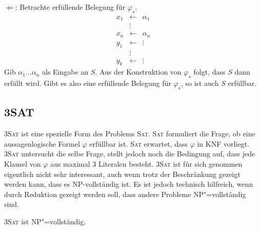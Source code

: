\begin{Bew}
  \glq$\Leftarrow$\grq: Betrachte erfüllende Belegung für $\varphi_s$.
  \[ \begin{array}{rcl} x_1 & \leftarrow & \alpha_1 \\ & \vdots & \\x_n & \leftarrow & \alpha_n \\ y_1 & \leftarrow & \vdots\\ & \vdots & \\ y_k & \leftarrow & \vdots \end{array}\]
  Gib $\alpha_1 \ldots \alpha_n$ als Eingabe an $S$. Aus der Konstruktion von $\varphi_s$ folgt, dass $S$ dann erfüllt wird. Gibt es also eine erfüllende Belegung für $\varphi_s$, so ist auch $S$ erfüllbar.
\end{Bew}

\subsection{3SAT}
\textsc{3Sat} ist eine spezielle Form des Problems \textsc{Sat}. \textsc{Sat} formuliert die Frage, ob eine aussagenlogische Formel $\varphi$ erfüllbar ist. \textsc{Sat} erwartet, dass $\varphi$ in KNF vorliegt. \textsc{3Sat} untersucht die selbe Frage, stellt jedoch noch die Bedingung auf, dass jede Klausel von $\varphi$ aus maximal 3 Literalen besteht. \textsc{3Sat} ist für sich genommen eigentlich nicht sehr interessant, auch wenn trotz der Beschränkung gezeigt werden kann, dass es \textsf{NP}-vollständig ist. Es ist jedoch technisch hilfreich, wenn durch Reduktion gezeigt werden soll, dass andere Probleme \textsf{NP}"=vollständig sind.

\begin{Beh}
  \hspace{\parindent}\textsc{3Sat} ist \textsf{NP}"=vollständig.
\end{Beh}


